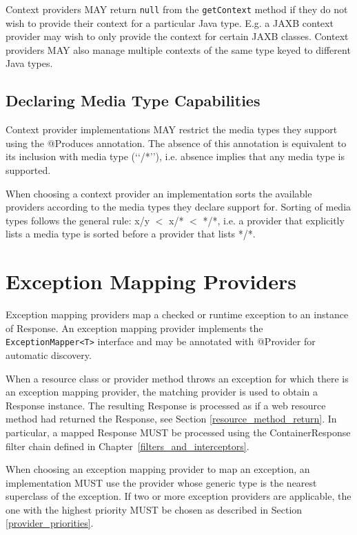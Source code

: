 Context providers MAY return \lstinline{null} from the \lstinline{getContext} method if they do not wish to provide
their context for a particular Java type. E.g. a JAXB context provider may wish to only provide the context for certain
JAXB classes. Context providers MAY also manage multiple contexts of the same type keyed to different Java types.

\subsection{Declaring Media Type Capabilities}
\label{context_media_type}

Context provider implementations MAY restrict the media types they support using the @Produces annotation.
The absence of this annotation is equivalent to its inclusion with media type (\lq\lq*/*\rq\rq), i.e. absence implies
that any media type is supported.

When choosing a context provider an implementation sorts the available providers according to the media types they
declare support for. Sorting of media types follows the general rule: x/y $<$ x/* $<$ */*, i.e. a provider that
explicitly lists a media type is sorted before a provider that lists */*.

\section{Exception Mapping Providers}
\label{exceptionmapper}

Exception mapping providers map a checked or runtime exception to an instance of Response. An exception mapping
provider implements the \lstinline{ExceptionMapper<T>} interface and may be annotated with @Provider for
automatic discovery.

When a resource class or provider method throws an exception for which there is an exception mapping provider, the
matching provider is used to obtain a Response instance. The resulting Response is processed as if a web resource method
had returned the Response, see Section \ref{resource_method_return}. In particular, a mapped Response MUST be processed
using the ContainerResponse filter chain defined in Chapter~\ref{filters_and_interceptors}.

When choosing an exception mapping provider to map an exception, an implementation MUST use the provider whose generic
type is the nearest superclass of the exception. If two or more exception providers are applicable, the one with the
highest priority MUST be chosen as described in Section \ref{provider_priorities}.

